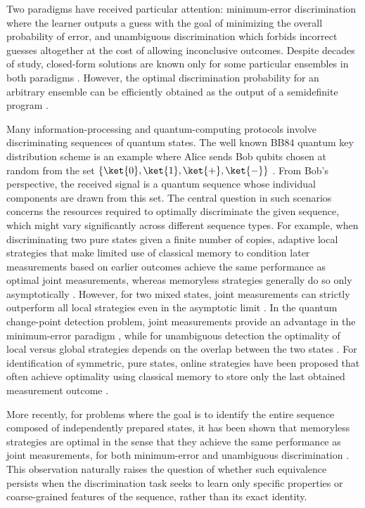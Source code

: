 Two paradigms have received particular attention: minimum-error discrimination \cite{bae2013structure} where the learner outputs a guess with the goal of minimizing the overall probability of error, and unambiguous discrimination \cite{ivanovic1987differentiate, dieks1988overlap, peres1988differentiate} which forbids incorrect guesses altogether at the cost of allowing inconclusive outcomes. 
Despite decades of study, closed-form solutions are known only for some particular ensembles in both paradigms \cite{jaeger1995optimal,barnett2009quantum}. 
However, the optimal discrimination probability for an arbitrary ensemble can be efficiently obtained as the output of a semidefinite program \cite{eldar2003designing,eldar2003semidefinite}.

Many information-processing and quantum-computing protocols involve discriminating sequences of quantum states. 
The well known BB84 quantum key distribution scheme is an example where Alice sends Bob qubits chosen at random from the set $\{\ket{0}, \ket{1}, \ket{+}, \ket{-}\}$ \cite{bennett2014quantum}. 
From Bob's perspective, the received signal is a quantum sequence whose individual components are drawn from this set. 
The central question in such scenarios concerns the resources required to optimally discriminate the given sequence, which might vary significantly across different sequence types. 
For example, when discriminating two pure states given a finite number of copies, adaptive local strategies that make limited use of classical memory to condition later measurements based on earlier outcomes achieve the same performance as optimal joint measurements, whereas memoryless strategies generally do so only asymptotically \cite{acin2005multiple}. 
However, for two mixed states, joint measurements can strictly outperform all local strategies even in the asymptotic limit \cite{calsamiglia2010local}. 
In the quantum change-point detection problem, joint measurements provide an advantage in the minimum-error paradigm \cite{sentis2016quantum}, while for unambiguous detection the optimality of local versus global strategies depends on the overlap between the two states \cite{sentis2017exact}. 
For identification of symmetric, pure states, online strategies have been proposed that often achieve optimality using classical memory to store only the last obtained measurement outcome \cite{sentis2022online}.

More recently, for problems where the goal is to identify the entire sequence composed of independently prepared states, it has been shown that memoryless strategies are optimal in the sense that they achieve the same performance as joint measurements, for both minimum-error and unambiguous discrimination \cite{gupta2024unambiguous,gupta2024optimal}. 
This observation naturally raises the question of whether such equivalence persists when the discrimination task seeks to learn only specific properties or coarse-grained features of the sequence, rather than its exact identity. 
